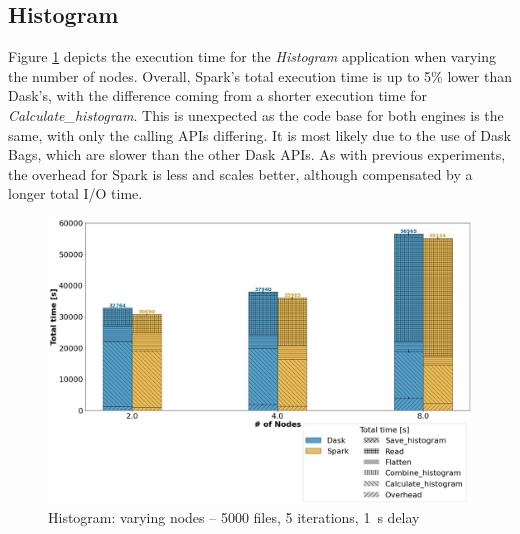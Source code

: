 \documentclass[conference]{IEEEtran}
\begin{document}
\subsection{Histogram}
Figure \ref{fig:histogram_worker} depicts the execution time for the \textit{Histogram} application when varying the number of nodes.
Overall, Spark's total execution time is up to 5\% lower than Dask's, with the difference coming from a shorter execution time for \textit{Calculate\_histogram}.
This is unexpected as the code base for both engines is the same, with only the calling APIs differing.
It is most likely due to the use of Dask Bags, which are slower than the other Dask APIs.
As with previous experiments, the overhead for Spark is less and scales better, although compensated by a longer total I/O time.
\begin{figure}[!t]
	\centering
	\includegraphics[clip,width=\columnwidth]{figures/stacked_histogram_worker.jpg}
	\caption{Histogram: varying nodes -- 5000 files, 5 iterations, \SI{1}{\second} delay}
	\label{fig:histogram_worker}
\end{figure}
		
\end{document}
